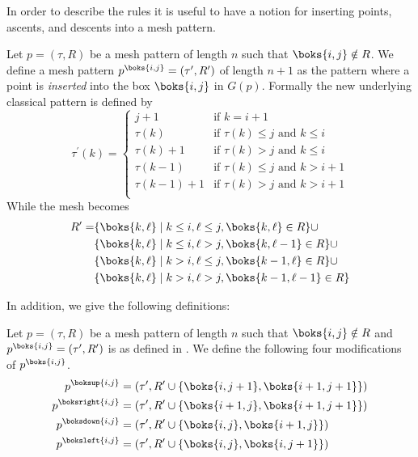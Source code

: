 In order to describe the rules it is useful to have a notion for inserting
points, ascents, and descents into a mesh pattern.
\begin{definition}
\label{def:ap}
Let \(p=(\tau,R)\) be a mesh pattern of length \(n\) such that
\(\boks{i,j}\notin R\). We define a mesh pattern \(p^\boks{i,j} =
(\tau^\prime,R^\prime)\) of length \(n+1\) as the pattern where a point is
\emph{inserted} into the box \(\boks{i,j}\) in \(G(p)\). Formally the new
underlying classical pattern is defined by
\begin{equation*}
\tau^\prime(k) = \begin{cases}
    j+1 & \text{if } k = i+1\\
    \tau(k) & \text{if } \tau(k)\le j \text{ and }k\le i\\
    \tau(k)+1 & \text{if } \tau(k)> j \text{ and }k\le i\\
    \tau(k-1) & \text{if } \tau(k)\le j \text{ and }k> i+1\\
    \tau(k-1)+1 & \text{if } \tau(k)> j \text{ and }k> i+1\\
\end{cases}
\end{equation*}
While the mesh becomes
\begin{equation*}
\begin{aligned}
R^\prime=&\{\boks{k,\ell}\mid k\le i, \ell\le j, \boks{k,\ell}\in R\} \cup\\
&\{\boks{k,\ell}\mid k\le i, \ell > j, \boks{k,\ell-1}\in R\}\cup\\
&\{\boks{k,\ell}\mid k > i, \ell \le j, \boks{k-1,\ell}\in R\}\cup\\
&\{\boks{k,\ell}\mid k > i, \ell > j, \boks{k-1,\ell-1}\in R\}\\
\end{aligned}
\end{equation*}
\end{definition}
In addition, we give the following definitions:
\begin{definition}
Let \(p=(\tau,R)\) be a mesh pattern of length \(n\) such that
\(\boks{i,j}\notin R\) and \(p^\boks{i,j} = (\tau^\prime,R^\prime)\) is as
defined in . We define the following four modifications of
\(p^\boks{i,j}\).
\begin{align*}
p^\boksup{i,j} &= (\tau^\prime, R^\prime \cup \{\boks{i,j+1},\boks{i+1,j+1}\})\\
p^\boksright{i,j} &= (\tau^\prime, R^\prime \cup \{\boks{i+1,j},\boks{i+1,j+1}\})\\
p^\boksdown{i,j} &= (\tau^\prime, R^\prime \cup \{\boks{i,j},\boks{i+1,j}\})\\
p^\boksleft{i,j} &= (\tau^\prime, R^\prime \cup \{\boks{i,j},\boks{i,j+1}\})\\
\end{align*}
\end{definition}
